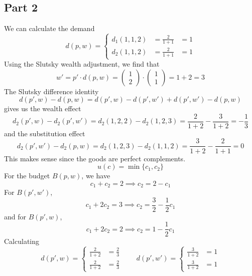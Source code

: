 \documentclass[12pt]{extarticle}
\numberwithin{table}{section}
\numberwithin{figure}{section}
\numberwithin{equation}{section}
\begin{document}
\subsection*{Part 2}
We can calculate the demand
\begin{equation}
    d(p, w) = \left\{\begin{array}{rll}
        d_1(1, 1, 2) & = \frac{2}{1 + 1} & = 1 \\
        d_2(1, 1, 2) & = \frac{2}{1 + 1} & = 1
    \end{array}\right.
\end{equation}
Using the Slutsky wealth adjustment, we find that
\begin{equation}
    w' = p' \cdot d(p, w) = \begin{pmatrix}1 \\ 2\end{pmatrix} \cdot \begin{pmatrix}1 \\ 1\end{pmatrix} = 1 + 2 = 3
\end{equation}
The Slutsky difference identity
\begin{equation}
    d(p', w) - d(p, w) = d(p', w) - d(p', w') + d(p', w') - d(p, w)
\end{equation}
gives us the wealth effect
\begin{equation}
    d_2(p', w) - d_2(p', w') = d_2(1, 2, 2) - d_2(1, 2, 3) = \frac{2}{1 + 2} - \frac{3}{1 + 2} = -\frac{1}{3}
\end{equation}
and the substitution effect
\begin{equation}
    d_2(p', w') - d_2(p, w) = d_2(1, 2, 3) - d_2(1, 1, 2) = \frac{3}{1 + 2} - \frac{2}{1 + 1} = 0
\end{equation}
This makes sense since the goods are perfect complements.
\begin{equation}
    u(c) = \min\{c_1, c_2\}
\end{equation}
For the budget $B(p, w)$, we have
\begin{equation}
    c_1 + c_2 = 2 \implies c_2 = 2 - c_1
\end{equation}
For $B(p', w')$,
\begin{equation}
    c_1 + 2c_2 = 3 \implies c_2 = \frac{3}{2} - \frac{1}{2}c_1
\end{equation}
and for $B(p', w)$,
\begin{equation}
    c_1 + 2c_2 = 2 \implies c_2 = 1 - \frac{1}{2}c_1
\end{equation}
Calculating
\begin{equation}
    d(p', w) = \left\{\begin{array}{rl} \frac{2}{1 + 2} &= \frac{2}{3} \\ \frac{2}{1 + 2} &= \frac{2}{3}\end{array}\right.
    \qquad d(p', w') = \left\{\begin{array}{rl} \frac{3}{1 + 2} &= 1 \\ \frac{3}{1 + 2} &= 1\end{array}\right.
\end{equation}
\end{document}
